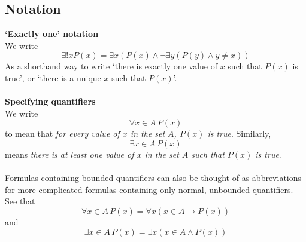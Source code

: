 \documentclass{report}
\begin{document}
\subsection{Notation}
\textbf{`Exactly one' notation}\\
We write 
\begin{equation*}
\exists!xP(x)=\exists x(P(x)\land\neg\exists y(P(y)\land y\neq x))
\end{equation*}
As a shorthand way to write `there is exactly one value of $x$ such that $P(x)$ is true', or `there is a unique $x$ such that $P(x)$'.\\
\vspace{1mm}\\
\textbf{Specifying quantifiers}\\
We write
\begin{equation*}
\forall x\in A\, P(x)
\end{equation*}
to mean that \textit{for every value of $x$ in the set $A$, $P(x)$ is true}. Similarly,
\begin{equation*}
\exists x\in A\, P(x)
\end{equation*}
means \textit{there is at least one value of $x $ in the set $A$ such that $P(x)$ is true}.\\
\vspace{1mm}\\
Formulas containing bounded quantifiers can also be thought of as abbreviations for more complicated formulas containing only normal, unbounded quantifiers. See that 
\begin{equation*}
\forall x\in A\, P(x)=\forall x(x\in A\to P(x))
\end{equation*}
and
\begin{equation*}
\exists x\in A\,P(x)=\exists x(x\in A\land P(x))
\end{equation*}
\newpage
\end{document}
